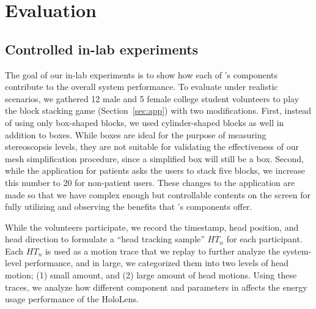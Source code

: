 \section{Evaluation}
\label{sec:eval}





\subsection{Controlled in-lab experiments}


The goal of our in-lab experiments is to show how each of {\myit}'s components 
contribute to the overall system performance.
%
To evaluate under realistic scenarios, we gathered 12 male and 5 female college
student volunteers to play the block stacking game (Section~\ref{sec:app})
with two modifications.
%
First, instead of using only box-shaped blocks, we
used cylinder-shaped blocks as well in addition to boxes.
%
While boxes are ideal for the purpose of measuring stereoscopsis levels, they 
are not suitable for validating the effectiveness of our mesh simplification
procedure, since a simplified box will still be a box.
%
Second, while the application for patients asks the users to stack five blocks,
we increase this number to 20 for non-patient users.
%
These changes to the application are made so that we have complex enough 
but controllable contents on the screen for fully utilizing and observing the 
benefits that {\myit}'s components offer.


While the volunteers participate,
we record the timestamp, head position, and head direction to formulate a 
``head tracking sample'' $HT_n$ for each participant.
%
Each $HT_n$ is used as a motion trace that we replay to further analyze the 
system-level performance, and in large, we categorized them into two levels of 
head motion; (1) small amount, and (2) large amount of head motions.
%
%
Using these traces, we analyze how different component and parameters in {\myit}
affects the energy usage performance of the HoloLens.


